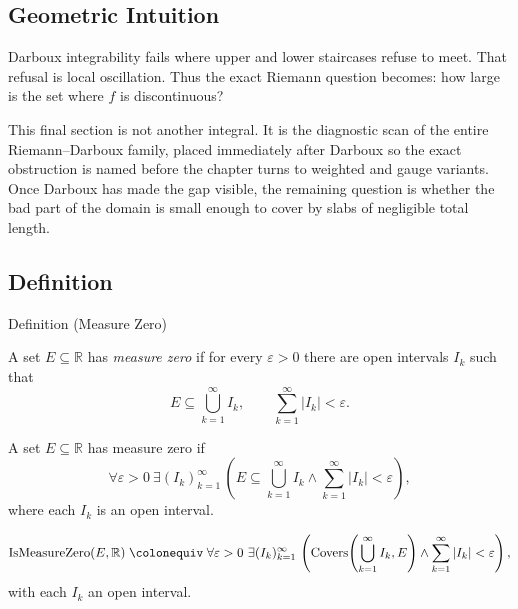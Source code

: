 \subsection*{Geometric Intuition}

\begin{exposition}
Darboux integrability fails where upper and lower staircases refuse to meet.
That refusal is local oscillation. Thus the exact Riemann question becomes:
how large is the set where \(f\) is discontinuous?
\end{exposition}

\begin{remark*}[Interpretation]
This final section is not another integral. It is the diagnostic scan of the
entire Riemann--Darboux family, placed immediately after Darboux so the exact
obstruction is named before the chapter turns to weighted and gauge variants.
Once Darboux has made the gap visible, the remaining question is
whether the bad part of the domain is small enough to cover by slabs of
negligible total length.
\end{remark*}

\subsection*{Definition}

\begin{definitionbox}{Definition (Measure Zero)}
\begin{definition}
\label{def:measure-zero}
A set \(E\subseteq\mathbb R\) has \emph{measure zero} if for every
\(\varepsilon>0\) there are open intervals \(I_k\) such that
\[
  E\subseteq\bigcup_{k=1}^{\infty}I_k,
  \qquad
  \sum_{k=1}^{\infty}|I_k|<\varepsilon.
\]
\end{definition}
\end{definitionbox}

\begin{remark*}
A set \(E\subseteq\mathbb R\) has measure zero if
\[
  \forall\varepsilon>0\ \exists (I_k)_{k=1}^{\infty}\,
  \left(
    E\subseteq\bigcup_{k=1}^{\infty}I_k
    \wedge
    \sum_{k=1}^{\infty}|I_k|<\varepsilon
  \right),
\]
where each \(I_k\) is an open interval.
\end{remark*}

\begin{remark*}
\[
  \operatorname{IsMeasureZero}(E,\mathbb{R})
  \;\colonequiv\;
  \forall\varepsilon>0\ \exists (I_k)_{k=1}^{\infty}\,
  \left(
    \operatorname{Covers}\!\left(\bigcup_{k=1}^{\infty}I_k,E\right)
    \wedge
    \sum_{k=1}^{\infty}|I_k|<\varepsilon
  \right),
\]
with each \(I_k\) an open interval.
\end{remark*}

